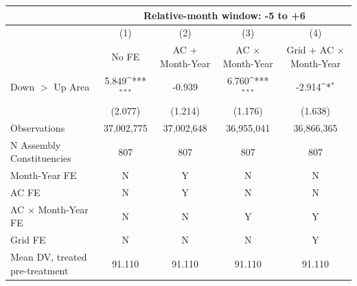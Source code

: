 {
\def\sym#1{\ifmmode^{#1}\else\(^{#1}\)\fi}
\begin{tabular}{l*{4}{c}}
\hline
&\multicolumn{4}{c}{Relative-month window: -5 to +6} \\ \hline
            &\multicolumn{1}{c}{(1)}&\multicolumn{1}{c}{(2)}&\multicolumn{1}{c}{(3)}&\multicolumn{1}{c}{(4)}\\
            &\multicolumn{1}{c}{No FE}&\multicolumn{1}{c}{AC + Month-Year}&\multicolumn{1}{c}{AC $\times$ Month-Year}&\multicolumn{1}{c}{Grid + AC $\times$ Month-Year}\\
\hline
Down $>$ Up Area&       5.849\sym{***}&      -0.939         &       6.760\sym{***}&      -2.914\sym{*}  \\
            &     (2.077)         &     (1.214)         &     (1.176)         &     (1.638)         \\
\hline
Observations&  37,002,775         &  37,002,648         &  36,955,041         &  36,866,365         \\
N Assembly Constituencies&         807         &         807         &         807         &         807         \\
Month-Year FE&           N         &           Y         &           N         &           N         \\
AC FE       &           N         &           Y         &           N         &           N         \\
AC $\times$ Month-Year FE&           N         &           N         &           Y         &           Y         \\
Grid FE     &           N         &           N         &           N         &           Y         \\
Mean DV, treated pre-treatment&      91.110         &      91.110         &      91.110         &      91.110         \\
\hline
\end{tabular}
}
